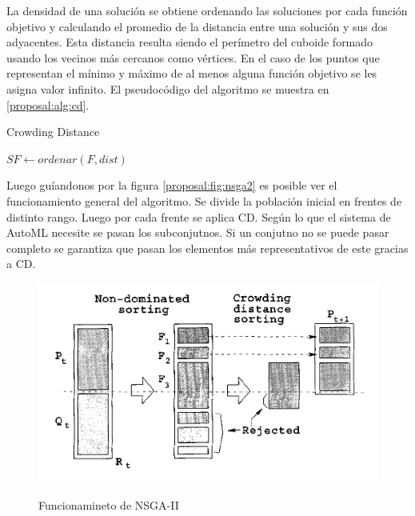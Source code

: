 La densidad de una soluci\'on se obtiene ordenando las soluciones por cada funci\'on objetivo y calculando el promedio de la distancia entre una soluci\'on y sus dos adyacentes. Esta distancia resulta siendo el per\'imetro del cuboide formado usando los vecinos m\'as cercanos como v\'ertices. En el caso de los puntos que representan el m\'inimo y m\'aximo de al menos alguna funci\'on objetivo se les asigna valor infinito. El pseudoc\'odigo del algoritmo se muestra en \ref{proposal:alg:cd}.

\begin{algorithm*}[H]\caption{Crowding Distance}\label{proposal:alg:cd}

    $SF \gets ordenar(F, dist)$ 

\end{algorithm*}

Luego gu\'iandonos por la figura \ref{proposal:fig:nsga2} es posible ver el funcionamiento general del algoritmo. Se divide la poblaci\'on inicial en frentes de distinto rango. Luego por cada frente se aplica CD. Seg\'un lo que el sistema de AutoML necesite se pasan los subconjutnos. Si un conjutno no se puede pasar completo se garantiza que pasan los elementos m\'as representativos de este gracias a CD.

\begin{figure}\caption{Funcionamineto de NSGA-II}\label{proposal:fig:nsga2}
    \includegraphics[width=\linewidth]{Pictures/nsga2.png}
    \label{nsga2}
\end{figure}

